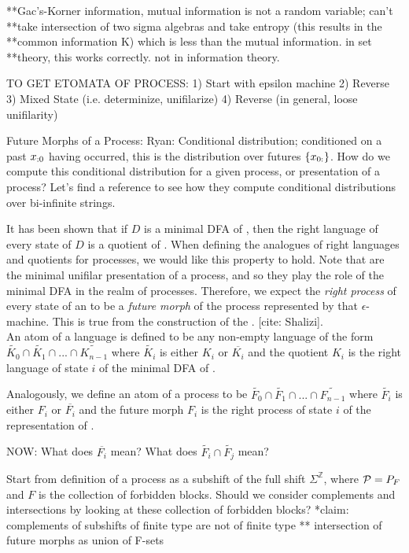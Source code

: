 \documentclass[prl,twocolumn,showpacs,superscriptaddress,preprintnumbers,floatfix]{revtex4-1}
\theoremstyle{plain}    \newtheorem{Lem}{Lemma}
\theoremstyle{plain}    \newtheorem*{ProLem}{Proof}
\theoremstyle{plain}    \newtheorem{Cor}{Corollary}
\theoremstyle{plain}    \newtheorem*{ProCor}{Proof}
\theoremstyle{plain}    \newtheorem{The}{Theorem}
\theoremstyle{plain}    \newtheorem*{ProThe}{Proof}
\theoremstyle{plain}    \newtheorem{Prop}{Proposition}
\theoremstyle{plain}    \newtheorem*{ProProp}{Proof}
\theoremstyle{plain}    \newtheorem*{Conj}{Conjecture}
\theoremstyle{plain}    \newtheorem*{Rem}{Remark}
\theoremstyle{plain}    \newtheorem{Def}{Definition}
\theoremstyle{plain}    \newtheorem*{Not}{Notation}
\begin{document}
**Gac's-Korner information, mutual information is not a random variable; can't
**take intersection of two sigma algebras and take entropy (this results in the
**common information K) which is less than the mutual information. in set
**theory, this works correctly. not in information theory.

TO GET ETOMATA OF PROCESS:
1) Start with epsilon machine
2) Reverse
3) Mixed State (i.e. determinize, unifilarize)
4) Reverse (in general, loose unifilarity)

Future Morphs of a Process: Ryan: Conditional distribution; conditioned on a
past ${x}_{:0}$ having occurred, this is the distribution over futures $\{
{x}_{0:}\}$. How do we compute this conditional distribution for a given
process, or presentation of a process? Let's find a reference to see how they
compute conditional distributions over bi-infinite strings.

It has been shown that if $D$ is a minimal DFA of \Language, then the right
language of every state of $D$ is a quotient of \Language.  When defining the
analogues of right languages and quotients for processes, we would like this
property to hold.  Note that \eM are the minimal unifilar
presentation of a process, and so they play the role of the minimal DFA in the
realm of processes.  Therefore, we expect the \emph{right process} of every
state of an \eM to be a \emph{future morph} of the process
represented by that $\epsilon$-machine.  This is true from the construction of
the \eM. [cite: Shalizi]. \\ An atom of a language \Language is
defined to be any non-empty language of the form $\widetilde{K_0} \cap
\widetilde{K_1} \cap ... \cap \widetilde{K_{n-1}}$ where $\widetilde{K_i}$ is
either $K_i$ or $\overline{K_i}$ and the quotient $K_i$ is the right language of
state $i$ of the minimal DFA of \Language.

Analogously, we define an atom of a process \Process to be $\widetilde{F_0} \cap
\widetilde{F_1} \cap ... \cap \widetilde{F_{n-1}}$ where $\widetilde{F_i}$ is
either $F_i$ or $\overline{F_i}$ and the future morph $F_i$ is the right process
of state $i$ of the \eM representation of \Process.

NOW: What does $\overline{F_i}$ mean? What does $\widetilde{F_i} \cap
\widetilde{F_j}$ mean?

Start from definition of a process \Process as a subshift of the full shift
$\Sigma^{\mathbb{Z}}$, where $\mathcal{P} = P_{F}$ and $F$ is the collection of
forbidden blocks.  Should we consider complements and intersections by looking
at these collection of forbidden blocks? *claim: complements of subshifts of
finite type are not of finite type ** intersection of future morphs as union of
F-sets
\end{document}
